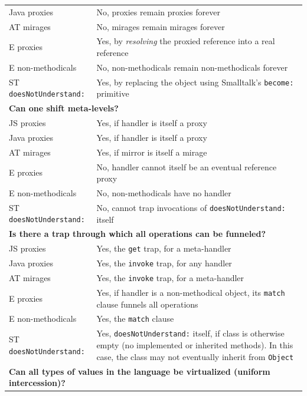 \documentclass{sig-alternate}
\begin{document}
\begin{table}
\begin{tabular}{|p{}|p{}|}
    Java proxies      & No, proxies remain proxies forever\\
    AT mirages        & No, mirages remain mirages forever\\
    E proxies         & Yes, by \emph{resolving} the proxied reference into a real reference\\
    E non-methodicals & No, non-methodicals remain non-methodicals forever\\
    ST \texttt{doesNotUnderstand:}  & Yes, by replacing the object using Smalltalk's \texttt{become:} primitive\\
    \hline
    \multicolumn{2}{|l|}{\textbf{Can one shift meta-levels?}}\\
    \hline
    JS proxies        & Yes, if handler is itself a proxy\\
    Java proxies      & Yes, if handler is itself a proxy\\
    AT mirages        & Yes, if mirror is itself a mirage\\
    E proxies         & No, handler cannot itself be an eventual reference proxy\\
    E non-methodicals & No, non-methodicals have no handler\\
    ST \texttt{doesNotUnderstand:}  & No, cannot trap invocations of \texttt{doesNotUnderstand:} itself\\
    \hline
    \multicolumn{2}{|l|}{\textbf{Is there a trap through which all operations can be funneled?}}\\
    \hline
    JS proxies        & Yes, the \texttt{get} trap, for a meta-handler\\
    Java proxies      & Yes, the \texttt{invoke} trap, for any handler\\
    AT mirages        & Yes, the \texttt{invoke} trap, for a meta-handler\\
    E proxies         & Yes, if handler is a non-methodical object, its \texttt{match} clause funnels all operations\\
    E non-methodicals & Yes, the \texttt{match} clause\\
    ST \texttt{doesNotUnderstand:}  & Yes, \texttt{doesNotUnderstand:} itself, if class is otherwise empty (no implemented or inherited methods). In this case, the class may not eventually inherit from \texttt{Object}\\
    \hline
    \multicolumn{2}{|l|}{\textbf{Can all types of values in the language be virtualized (uniform intercession)?}}\\
    \hline

\end{tabular}
\end{table}
\end{document}
